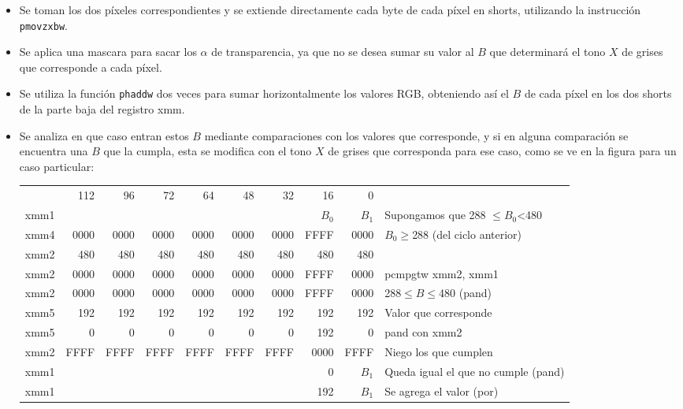 \documentclass[a4paper]{article}
\begin{document}
\begin{itemize}
\item Se toman los dos píxeles correspondientes y se extiende directamente cada byte de cada píxel en shorts, utilizando la instrucción \texttt{pmovzxbw}.
\item Se aplica una mascara para sacar los $\alpha$ de transparencia, ya que no se desea sumar su valor al $B$ que determinará el tono $X$ de grises que corresponde a cada píxel.
\item Se utiliza la función \texttt{phaddw} dos veces para sumar horizontalmente los valores RGB, obteniendo así el $B$ de cada píxel en los dos shorts de la parte baja del registro xmm.
\item Se analiza en que caso entran estos $B$ mediante comparaciones con los valores que corresponde, y si en alguna comparación se encuentra una $B$ que la cumpla, esta se modifica con el tono $X$ de grises que corresponda para ese caso, como se ve en la figura para un caso particular:

\begin{tabular}{r r|r|r|r|r|r|r|r||l} 

& 112 & 96 & 72 & 64 & 48 & 32 & 16 & 0 \\
xmm1 &      &      &      &      &      &      & $B_0$  & $B_1$  &  Supongamos que 288 $\leq B_0$\textless 480 \\ 
xmm4 & 0000 & 0000 & 0000 & 0000 & 0000 & 0000 & FFFF   & 0000   & $B_0 \geq$288 (del ciclo anterior)          \\ 
xmm2 & 480  & 480  & 480  & 480  & 480  & 480  & 480    & 480    &                                             \\
xmm2 & 0000 & 0000 & 0000 & 0000 & 0000 & 0000 & FFFF   & 0000   & pcmpgtw xmm2, xmm1                          \\
xmm2 & 0000 & 0000 & 0000 & 0000 & 0000 & 0000 & FFFF   & 0000   & 288$\leq B\leq$480 (pand)                   \\ 
xmm5 & 192  & 192  & 192  & 192  & 192  & 192  & 192    & 192    & Valor que corresponde                       \\
xmm5 & 0    & 0    & 0    & 0    & 0    & 0    & 192    & 0      & pand con xmm2                               \\
xmm2 & FFFF & FFFF & FFFF & FFFF & FFFF & FFFF & 0000   & FFFF   & Niego los que cumplen                       \\ 
xmm1 &      &      &      &      &      &      & 0      & $B_1$  & Queda igual el que no cumple (pand)         \\ 
xmm1 &      &      &      &      &      &      & 192    & $B_1$  & Se agrega el valor (por)                    \\
\end{tabular}



\end{itemize}
\end{document}
